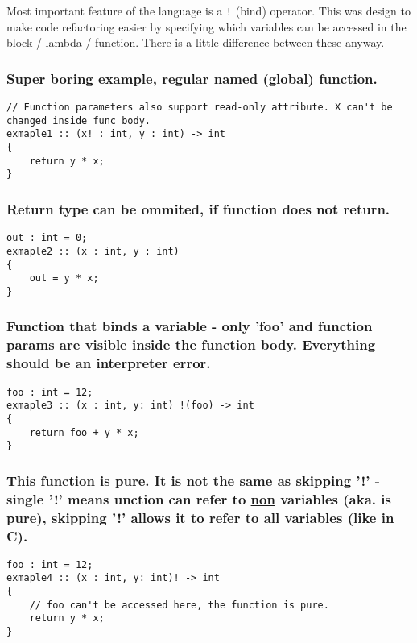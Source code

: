 \documentclass[11pt]{article}
\begin{document}
Most important feature of the language is a \texttt{!} (bind) operator. This was design
to make code refactoring easier by specifying which variables can be accessed in
the block / lambda / function. There is a little difference between these
anyway.

\subsubsection*{Super boring example, regular named (global) function.}
\label{sec:orgae04bf8}
\begin{verbatim}
// Function parameters also support read-only attribute. X can't be changed inside func body.
exmaple1 :: (x! : int, y : int) -> int
{
    return y * x;
}
\end{verbatim}

\subsubsection*{Return type can be ommited, if function does not return.}
\label{sec:org5b797a1}
\begin{verbatim}
out : int = 0;
exmaple2 :: (x : int, y : int)
{
    out = y * x;
}
\end{verbatim}

\subsubsection*{Function that binds a variable - only 'foo' and function params are visible inside the function body. Everything should be an interpreter error.}
\label{sec:orgaac2297}
\begin{verbatim}
foo : int = 12;
exmaple3 :: (x : int, y: int) !(foo) -> int
{
    return foo + y * x;
}
\end{verbatim}

\subsubsection*{This function is pure. It is not the same as skipping '!' - single '!' means unction can refer to \underline{non} variables (aka. is pure), skipping '!' allows it to refer to all variables (like in C).}
\label{sec:org23e3db3}
\begin{verbatim}
foo : int = 12;
exmaple4 :: (x : int, y: int)! -> int
{
    // foo can't be accessed here, the function is pure.
    return y * x;
}
\end{verbatim}
\end{document}
